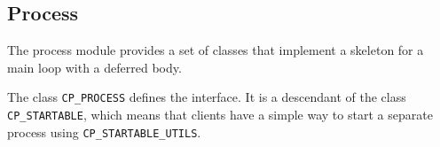 % 
% 
%   
%     
%   
% 
%     
% 
% 
% 
% 
% 


\subsection{Process}

The process module provides a set of classes that implement a skeleton for a main loop with a deferred body.

The class \lstinline!CP_PROCESS! defines the interface.
It is a descendant of the class \lstinline!CP_STARTABLE!, which means that clients have a simple way to start a separate process using \lstinline!CP_STARTABLE_UTILS!.

